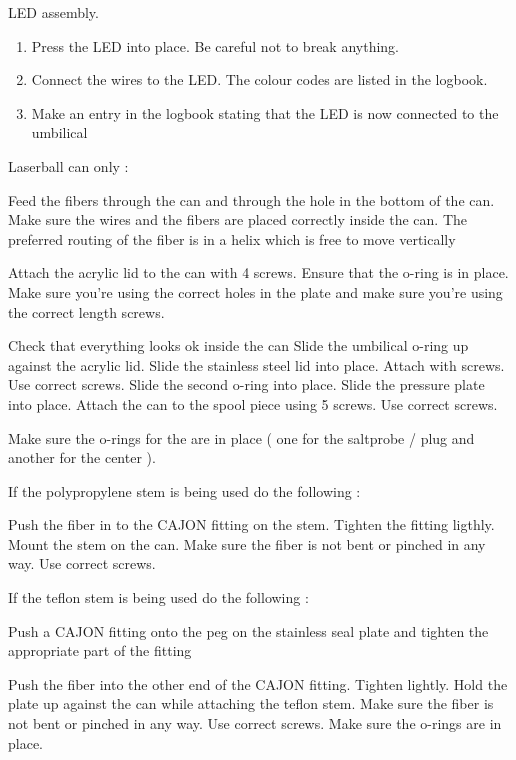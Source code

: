 \begin{enumerate}
\checkitem LED assembly.
\begin{enumerate}
\item Press the LED into place. Be careful not to break anything.
\item Connect the wires to the LED. The colour codes are listed in the logbook.
\item Make an entry in the logbook stating that the LED is now connected to the umbilical
\end{enumerate}

  Laserball can only :

\checkitem Feed the fibers through the can and through the hole in the bottom of the can.
\checkitem Make sure the wires and the fibers are placed correctly inside the can. The
preferred routing of the fiber is in a helix which is free to move vertically

\checkitem Attach the acrylic lid to the can with 4 screws. Ensure that the o-ring is in place.
Make sure you're using the correct holes in the plate and make sure you're using the correct
length  screws.

\checkitem Check that everything looks ok inside the can
\checkitem Slide the umbilical o-ring up against the acrylic lid.
\checkitem Slide the stainless steel lid into place. Attach with screws. Use correct screws.
\checkitem Slide the second o-ring into place.
\checkitem Slide the pressure plate into place.
\checkitem Attach the can to the spool piece using 5 screws. Use correct screws.

\checkitem Make sure the o-rings for the are in place ( one for the saltprobe / plug
and another for the center ).

    If the polypropylene stem is being used do the following :

\checkitem Push the fiber in to the CAJON  fitting on the stem. Tighten the fitting ligthly. 
\checkitem Mount the stem on the can. Make sure the fiber is not bent or pinched
in any way. Use correct screws.


    If the teflon stem is being used do the following :

\checkitem Push a CAJON fitting onto the peg on the stainless seal plate and tighten the
appropriate part of the fitting

\checkitem Push the fiber into the other end of the CAJON fitting. Tighten lightly.
\checkitem Hold the plate up against the can while attaching the teflon stem.
Make sure the fiber is not bent or pinched
in any way. Use correct screws. Make sure the o-rings are in place.


\end{enumerate}

